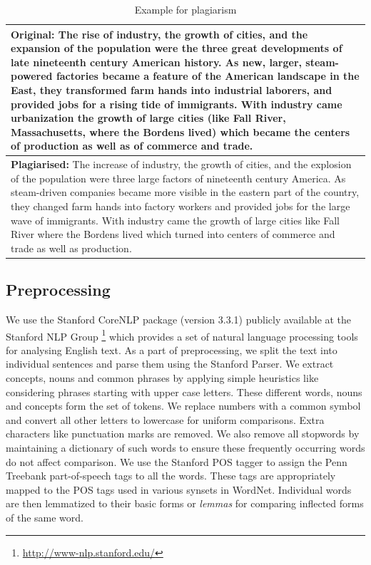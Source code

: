 \documentclass[11pt]{article}
\begin{document}
\begin{table}[h]
\footnotesize
\begin{tabularx}{\columnwidth}{|X|}
\hline
\textbf{Original:} The rise of industry, the growth of cities, and the expansion of the population were the three great developments of late nineteenth century American history. As new, larger, steam-powered factories became a feature of the American landscape in the East, they transformed farm hands into industrial laborers, and provided jobs for a rising tide of immigrants. With industry came urbanization the growth of large cities (like Fall River, Massachusetts, where the Bordens lived) which became the centers of production as well as of commerce and trade.\\
\hline
\textbf{Plagiarised:} The increase of industry, the growth of cities, and the explosion of the population were three large factors of nineteenth century America. As steam-driven companies became more visible in the eastern part of the country, they changed farm hands into factory workers and provided jobs for the large wave of immigrants. With industry came the growth of large cities like Fall River where the Bordens lived which turned into centers of commerce and trade as well as production.
\\
\hline
\end{tabularx}
\caption{Example for plagiarism}
 \label{ex}
\end{table}

\subsection{Preprocessing}
 We use the Stanford CoreNLP package (version 3.3.1) publicly available at the Stanford NLP Group \footnote{\url{http://www-nlp.stanford.edu/}} which provides a set of natural language processing tools for analysing English text. As a part of preprocessing, we split the text into individual sentences and parse them using the Stanford Parser. We extract concepts, nouns and common phrases by applying simple heuristics like considering phrases starting with upper case letters. These different words, nouns and concepts form the set of tokens. We replace numbers with a common symbol and convert all other letters to lowercase for uniform comparisons. Extra characters like punctuation marks are removed. We also remove all stopwords by maintaining a dictionary of such words to ensure these frequently occurring words do not affect comparison. We use the Stanford POS tagger to assign the Penn Treebank part-of-speech tags to all the words. These tags are appropriately mapped to the POS tags used in various synsets in WordNet. Individual words are then lemmatized to their basic forms or {\em  lemmas} for comparing inflected forms of the same word.
\end{document}
